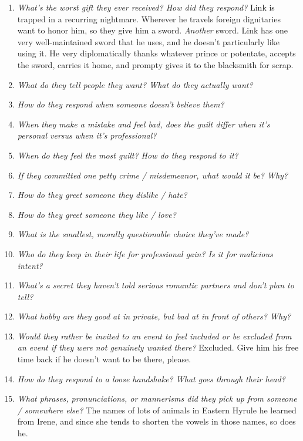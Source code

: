 \begin{enumerate}
    \item\textit{What’s the worst gift they ever received? How did they respond?} Link is trapped in a recurring nightmare. Wherever he travels foreign dignitaries want to honor him, so they give him a sword. \emph{Another} sword. Link has one very well-maintained sword that he uses, and he doesn't particularly like using it. He very diplomatically thanks whatever prince or potentate, accepts the sword, carries it home, and prompty gives it to the blacksmith for scrap.
    \item\textit{What do they tell people they want? What do they actually want?} 
    \item\textit{How do they respond when someone doesn’t believe them?}
    \item\textit{When they make a mistake and feel bad, does the guilt differ when it’s personal versus when it’s professional?}
    \item\textit{When do they feel the most guilt? How do they respond to it?}
    \item\textit{If they committed one petty crime / misdemeanor, what would it be? Why?} 
    \item\textit{How do they greet someone they dislike / hate?}
    \item\textit{How do they greet someone they like / love?}
    \item\textit{What is the smallest, morally questionable choice they’ve made?}
    \item\textit{Who do they keep in their life for professional gain? Is it for malicious intent?}
    \item\textit{What’s a secret they haven’t told serious romantic partners and don’t plan to tell?} 
    \item\textit{What hobby are they good at in private, but bad at in front of others? Why?}
    \item\textit{Would they rather be invited to an event to feel included or be excluded from an event if they were not genuinely wanted there?} Excluded. Give him his free time back if he doesn't want to be there, please.
    \item\textit{How do they respond to a loose handshake? What goes through their head?}
    \item\textit{What phrases, pronunciations, or mannerisms did they pick up from someone / somewhere else?} The names of lots of animals in Eastern Hyrule he learned from Irene, and since she tends to shorten the vowels in those names, so does he. 

\end{enumerate}
